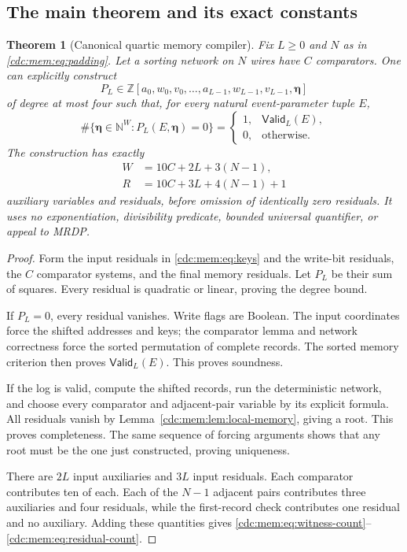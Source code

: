 \documentclass[11pt,a4paper]{article}
\newtheorem{theorem}{Theorem}[section]
\theoremstyle{definition}
\theoremstyle{remark}
\newcommand{\N}{\mathbb N}
\newcommand{\Z}{\mathbb Z}
\newcommand{\Valid}{\mathsf{Valid}}
\begin{document}
\subsection{The main theorem and its exact constants}
\begin{theorem}[Canonical quartic memory compiler]\label{cdc:mem:thm:memory}
Fix $L\geq0$ and $N$ as in \eqref{cdc:mem:eq:padding}. Let a sorting network on $N$
wires have $C$ comparators. One can explicitly construct
\[
 P_L\in\Z[a_0,w_0,v_0,\ldots,a_{L-1},w_{L-1},v_{L-1},\boldsymbol\eta]
\]
of degree at most four such that, for every natural event-parameter tuple $E$,
\begin{equation}\label{cdc:mem:eq:main-equivalence}
 \#\{\boldsymbol\eta\in\N^{W}:P_L(E,\boldsymbol\eta)=0\}
 =\begin{cases}1,&\Valid_L(E),\\0,&\text{otherwise}.
 \end{cases}
\end{equation}
The construction has exactly
\begin{align}
 W&=10C+2L+3(N-1),\label{cdc:mem:eq:witness-count}\\
 R&=10C+3L+4(N-1)+1\label{cdc:mem:eq:residual-count}
\end{align}
auxiliary variables and residuals, before omission of identically zero
residuals. It uses no exponentiation, divisibility predicate, bounded universal
quantifier, or appeal to MRDP.
\end{theorem}
\begin{proof}
Form the input residuals in \eqref{cdc:mem:eq:keys} and the write-bit residuals, the
$C$ comparator systems, and the final memory residuals. Let $P_L$ be their sum
of squares. Every residual is quadratic or linear, proving the degree bound.

If $P_L=0$, every residual vanishes. Write flags are Boolean. The input
coordinates force the shifted addresses and keys; the comparator lemma and
network correctness force the sorted permutation of complete records. The
sorted memory criterion then proves $\Valid_L(E)$. This proves soundness.

If the log is valid, compute the shifted records, run the deterministic
network, and choose every comparator and adjacent-pair variable by its explicit
formula. All residuals vanish by Lemma~\ref{cdc:mem:lem:local-memory}, giving a root.
This proves completeness. The same sequence of forcing arguments shows that
any root must be the one just constructed, proving uniqueness.

There are $2L$ input auxiliaries and $3L$ input residuals. Each comparator
contributes ten of each. Each of the $N-1$ adjacent pairs contributes three
auxiliaries and four residuals, while the first-record check contributes one
residual and no auxiliary. Adding these quantities gives
\eqref{cdc:mem:eq:witness-count}--\eqref{cdc:mem:eq:residual-count}.
\end{proof}
\end{document}
